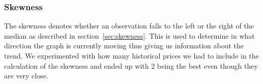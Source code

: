 \begin{table}[H]
\centering  %
\caption{Smoothing factor test} %
\label{table:SmoothingFactorTest} %
\end{table}

\subsubsection{Skewness}
The skewness denotes whether an observation falls to the left or the right of the median as described in section~\ref{sec:skewness}. This is used to determine in what direction the graph is currently moving thus giving us information about the trend. We experimented with how many historical prices we had to include in the calculation of the skewness and ended up with 2 being the best even though they are very close.

